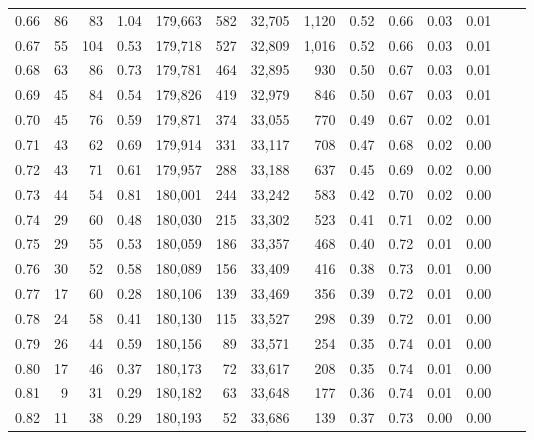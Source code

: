 \begin{tabular}{rrrrrrrrrrrrrr}
0.66 &      86 &     83 &    1.04 &  179,663 &      582 &  32,705 &   1,120 &  0.52 &  0.66 &  0.03 &      0.01 \\
0.67 &      55 &    104 &    0.53 &  179,718 &      527 &  32,809 &   1,016 &  0.52 &  0.66 &  0.03 &      0.01 \\
0.68 &      63 &     86 &    0.73 &  179,781 &      464 &  32,895 &     930 &  0.50 &  0.67 &  0.03 &      0.01 \\
0.69 &      45 &     84 &    0.54 &  179,826 &      419 &  32,979 &     846 &  0.50 &  0.67 &  0.03 &      0.01 \\
0.70 &      45 &     76 &    0.59 &  179,871 &      374 &  33,055 &     770 &  0.49 &  0.67 &  0.02 &      0.01 \\
0.71 &      43 &     62 &    0.69 &  179,914 &      331 &  33,117 &     708 &  0.47 &  0.68 &  0.02 &      0.00 \\
0.72 &      43 &     71 &    0.61 &  179,957 &      288 &  33,188 &     637 &  0.45 &  0.69 &  0.02 &      0.00 \\
0.73 &      44 &     54 &    0.81 &  180,001 &      244 &  33,242 &     583 &  0.42 &  0.70 &  0.02 &      0.00 \\
0.74 &      29 &     60 &    0.48 &  180,030 &      215 &  33,302 &     523 &  0.41 &  0.71 &  0.02 &      0.00 \\
0.75 &      29 &     55 &    0.53 &  180,059 &      186 &  33,357 &     468 &  0.40 &  0.72 &  0.01 &      0.00 \\
0.76 &      30 &     52 &    0.58 &  180,089 &      156 &  33,409 &     416 &  0.38 &  0.73 &  0.01 &      0.00 \\
0.77 &      17 &     60 &    0.28 &  180,106 &      139 &  33,469 &     356 &  0.39 &  0.72 &  0.01 &      0.00 \\
0.78 &      24 &     58 &    0.41 &  180,130 &      115 &  33,527 &     298 &  0.39 &  0.72 &  0.01 &      0.00 \\
0.79 &      26 &     44 &    0.59 &  180,156 &       89 &  33,571 &     254 &  0.35 &  0.74 &  0.01 &      0.00 \\
0.80 &      17 &     46 &    0.37 &  180,173 &       72 &  33,617 &     208 &  0.35 &  0.74 &  0.01 &      0.00 \\
0.81 &       9 &     31 &    0.29 &  180,182 &       63 &  33,648 &     177 &  0.36 &  0.74 &  0.01 &      0.00 \\
0.82 &      11 &     38 &    0.29 &  180,193 &       52 &  33,686 &     139 &  0.37 &  0.73 &  0.00 &      0.00 \\

\end{tabular}
